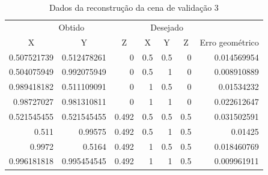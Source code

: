 		\begin{table}
			\caption{Dados da reconstrução da cena de validação 3}
			\label{tabelaErrosCuboReduzido}
			\begin{center}
				\begin{tabular}{r r r | r r r | r}
					\hline
					\multicolumn{3}{c}{Obtido} & \multicolumn{3}{c}{Desejado}\\
					\cline{1-6}
					\multicolumn{1}{c}{X} & \multicolumn{1}{c}{Y} & \multicolumn{1}{c}{Z} & \multicolumn{1}{c}{X} & \multicolumn{1}{c}{Y} & \multicolumn{1}{c}{Z} & \multicolumn{1}{c}{Erro geométrico}\\
					\hline			
					0.507521739		&			0.512478261		&		0				&		0.5			&		0.5			&		0			&		0.014569954\\
					0.504075949		&			0.992075949		&		0				&		0.5			&		1				&		0			&		0.008910889\\
					0.989418182		&			0.511109091		&		0				&		1				&		0.5			&		0			&		0.01534232\\
					0.98727027		& 		0.981310811		&		0				&		1				&		1				&		0			&		0.022612647\\
					0.521545455		&			0.521545455		&		0.492		&		0.5			&		0.5			&		0.5		&		0.031502591\\
					0.511					&			0.99575				&		0.492		&		0.5			&		1				&		0.5		&		0.01425\\
					0.9972 				&			0.5164				&		0.492		&		1				&		0.5			&		0.5		&		0.018460769\\
					0.996181818		&			0.995454545		&		0.492		&		1				&		1				&		0.5		&		0.009961911\\
					\hline	
				\end{tabular}
			\end{center}
		\end{table}	
		
		
		

